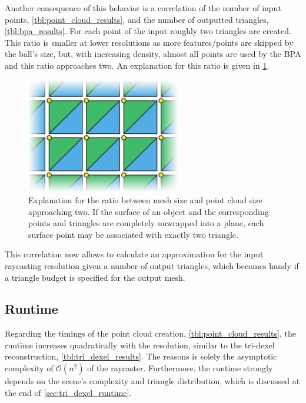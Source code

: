 Another consequence of this behavior is a correlation of the number of input points, \cf \cref{tbl:point_cloud_results}, and the number of outputted triangles, \cf \cref{tbl:bpa_results}.
For each point of the input roughly two triangles are created.
This ratio is smaller at lower resolutions as more features/points are skipped by the ball's size, but, with increasing density, almost all points are used by the BPA and this ratio approaches two.
An explanation for this ratio is given in \cref{fig:bpa_point_triangle_ratio}.
%
\begin{figure}
	\centering
	\includegraphics[width=0.6\textwidth]{images/bpa_point_triangle_ratio}
	\caption[BPA point to triangle ratio]{
		Explanation for the ratio between mesh size and point cloud size approaching two.
		If the surface of an object and the corresponding points and triangles are completely unwrapped into a plane, each surface point may be associated with exactly two triangle.
	}
	\label{fig:bpa_point_triangle_ratio}
\end{figure}
%
This correlation now allows to calculate an approximation for the input raycasting resolution given a number of output triangles, which becomes handy if a triangle budget is specified for the output mesh.


\subsection{Runtime}

Regarding the timings of the point cloud creation, \cf \cref{tbl:point_cloud_results}, the runtime increases quadratically with the resolution, similar to the tri-dexel reconstruction, \cf \cref{tbl:tri_dexel_results}.
The reasons is solely the asymptotic complexity of $\mathcal{O}(n^2)$ of the raycaster.
Furthermore, the runtime strongly depends on the scene's complexity and triangle distribution, which is discussed at the end of \cref{sec:tri_dexel_runtime}.

